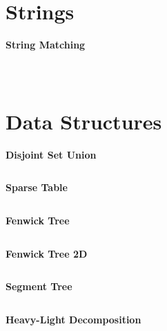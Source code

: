 \documentclass[a4paper, 10pt, twocolumn, landscape]{article}
\begin{document}
  
  \section{Strings}
  \textbf{String Matching}
  \inputminted{cpp}{strings/rabin-karp.cpp}
  \inputminted{cpp}{strings/kmp.cpp}
  \inputminted{cpp}{strings/suffix-array.cpp}

 
  \section{Data Structures}
  \textbf{Disjoint Set Union}
  \inputminted{cpp}{data-structures/dsu.cpp}
  \textbf{Sparse Table}
  \inputminted{cpp}{data-structures/sparse-table.cpp}
  \textbf{Fenwick Tree}
  \inputminted{cpp}{data-structures/bit.cpp}
  \textbf{Fenwick Tree 2D}
  \inputminted{cpp}{data-structures/bit2d.cpp}
  \textbf{Segment Tree}
  \inputminted{cpp}{data-structures/segtree.cpp}
  \textbf{Heavy-Light Decomposition}
  \inputminted{cpp}{data-structures/hld.cpp}
\end{document}
